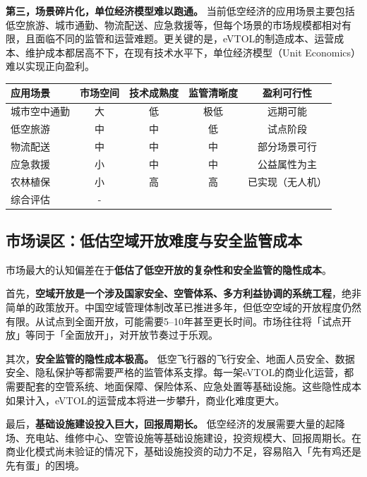 \textbf{第三，场景碎片化，单位经济模型难以跑通。} 当前低空经济的应用场景主要包括低空旅游、城市通勤、物流配送、应急救援等，但每个场景的市场规模都相对有限，且面临不同的监管和运营难题。更关键的是，eVTOL的制造成本、运营成本、维护成本都居高不下，在现有技术水平下，单位经济模型（Unit Economics）难以实现正向盈利。

\begin{exhibitbox}[表 7-2：eVTOL主要场景商业化可行性评估]
\label{tab:evtol-scenario-assessment}
\centering
\small
\begin{tabularx}{\textwidth}{X c c c c}
\toprule
\textbf{应用场景} & \textbf{市场空间} & \textbf{技术成熟度} & \textbf{监管清晰度} & \textbf{盈利可行性} \\
\midrule
城市空中通勤 & 大 & 低 & 极低 & 远期可能 \\
低空旅游 & 中 & 中 & 低 & 试点阶段 \\
物流配送 & 中 & 中 & 中 & 部分场景可行 \\
应急救援 & 小 & 中 & 中 & 公益属性为主 \\
农林植保 & 小 & 高 & 高 & 已实现（无人机） \\
\cmidrule(lr){1-5}
综合评估 & - &  \\
\bottomrule
\end{tabularx}
\end{exhibitbox}

\subsection{市场误区：低估空域开放难度与安全监管成本}

市场最大的认知偏差在于\textbf{低估了低空开放的复杂性和安全监管的隐性成本}。

首先，\textbf{空域开放是一个涉及国家安全、空管体系、多方利益协调的系统工程}，绝非简单的政策放开。中国空域管理体制改革已推进多年，但低空空域的开放程度仍然有限。从试点到全面开放，可能需要5--10年甚至更长时间。市场往往将「试点开放」等同于「全面放开」，对开放节奏过于乐观。

其次，\textbf{安全监管的隐性成本极高。} 低空飞行器的飞行安全、地面人员安全、数据安全、隐私保护等都需要严格的监管体系支撑。每一架eVTOL的商业化运营，都需要配套的空管系统、地面保障、保险体系、应急处置等基础设施。这些隐性成本如果计入，eVTOL的运营成本将进一步攀升，商业化难度更大。

最后，\textbf{基础设施建设投入巨大，回报周期长。} 低空经济的发展需要大量的起降场、充电站、维修中心、空管设施等基础设施建设，投资规模大、回报周期长。在商业化模式尚未验证的情况下，基础设施投资的动力不足，容易陷入「先有鸡还是先有蛋」的困境。

